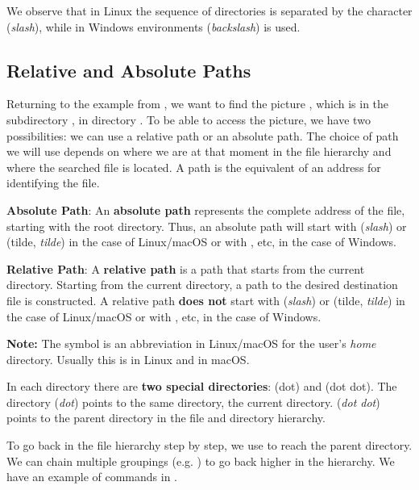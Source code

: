 We observe that in Linux the sequence of directories is separated by the character \file{/} (\textit{slash}), while in Windows environments \file{\textbackslash{}} (\textit{backslash}) is used.

\subsection{Relative and Absolute Paths}
\label{sec:data-files:path}

Returning to the example from , we want to find the picture , which is in the subdirectory , in directory .
To be able to access the picture, we have two possibilities: we can use a relative path or an absolute path.
The choice of path we will use depends on where we are at that moment in the file hierarchy and where the searched file is located.
A path is the equivalent of an address for identifying the file.

\textbf{Absolute Path}: An \textbf{absolute path} represents the complete address of the file, starting with the root directory.
Thus, an absolute path will start with \file{/} (\textit{slash}) or \file{\textasciitilde{}} (tilde, \textit{tilde}) in the case of Linux/macOS or with ,  etc, in the case of Windows.

\textbf{Relative Path}: A \textbf{relative path} is a path that starts from the current directory.
Starting from the current directory, a path to the desired destination file is constructed.
A relative path \textbf{does not} start with \file{/} (\textit{slash}) or \file{\textasciitilde{}} (tilde, \textit{tilde}) in the case of Linux/macOS or with ,  etc, in the case of Windows.

\textbf{Note:} The symbol \file{\textasciitilde{}} is an abbreviation in Linux/macOS for the user's \textit{home} directory.
Usually this is  in Linux and  in macOS.

In each directory there are \textbf{two special directories}:  (dot) and  (dot dot).
The directory  (\textit{dot}) points to the same directory, the current directory.
 (\textit{dot dot}) points to the parent directory in the file and directory hierarchy.

To go back in the file hierarchy step by step, we use  to reach the parent directory.
We can chain multiple  groupings (e.g. ) to go back higher in the hierarchy.
We have an example of commands in .

